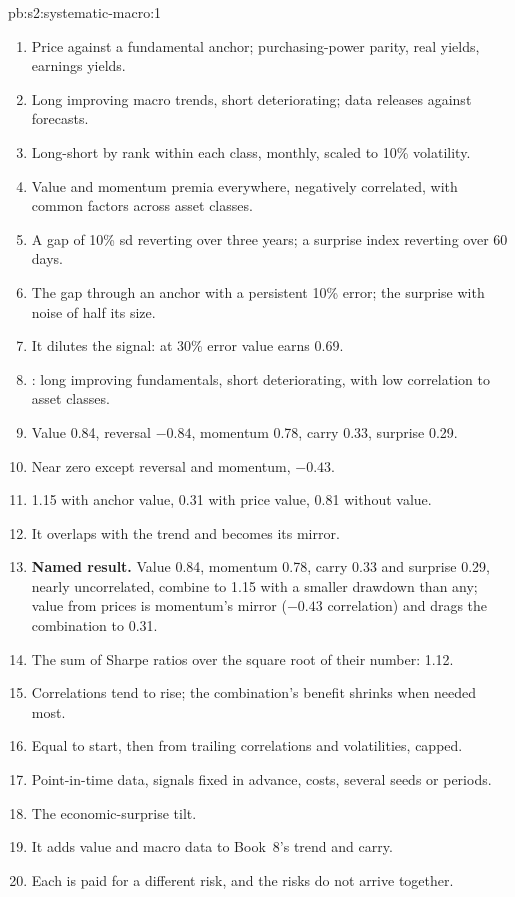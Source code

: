 \begin{solution}{pb:s2:systematic-macro:1}
\begin{enumerate}
\item Price against a fundamental anchor; purchasing-power parity, real yields, earnings yields.
\item Long improving macro trends, short deteriorating; data releases against forecasts.
\item Long-short by rank within each class, monthly, scaled to 10\% volatility.
\item Value and momentum premia everywhere, negatively correlated, with common factors across asset classes.
\item A gap of 10\% sd reverting over three years; a surprise index reverting over 60 days.
\item The gap through an anchor with a persistent 10\% error; the surprise with noise of half its size.
\item It dilutes the signal: at 30\% error value earns 0.69.
\item {}: long improving fundamentals, short deteriorating, with low correlation to asset classes.
\item Value 0.84, reversal $-0.84$, momentum 0.78, carry 0.33, surprise 0.29.
\item Near zero except reversal and momentum, $-0.43$.
\item 1.15 with anchor value, 0.31 with price value, 0.81 without value.
\item It overlaps with the trend and becomes its mirror.
\item \textbf{Named result.} Value 0.84, momentum 0.78, carry 0.33 and surprise 0.29, nearly uncorrelated, combine to 1.15 with a smaller drawdown
than any; value from prices is momentum's mirror ($-0.43$ correlation) and drags the combination to 0.31.
\item The sum of Sharpe ratios over the square root of their number: 1.12.
\item Correlations tend to rise; the combination's benefit shrinks when needed most.
\item Equal to start, then from trailing correlations and volatilities, capped.
\item Point-in-time data, signals fixed in advance, costs, several seeds or periods.
\item The economic-surprise tilt.
\item It adds value and macro data to Book~8's trend and carry.
\item Each is paid for a different risk, and the risks do not arrive together.
\end{enumerate}
\end{solution}

